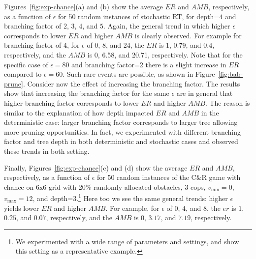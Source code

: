 \documentclass[runningheads]{llncs}
\newcounter{bab}
\newcommand{\vmax}{v_{\text{max}}}
\newcommand{\vmin}{v_{\text{min}}}
\newcommand{\amb}{\mathit{AMB}}
\newcommand{\er}{\mathit{ER}}
\begin{document}
Figures~\ref{fig:exp-chance}(a) and (b) show the average $\er$ and $\amb$, respectively, as a function of $\epsilon$ for 50 random instances of stochastic RT, for depth=$4$ and branching factor of $2$, $3$, $4$, and $5$. Again, the general trend in which higher $\epsilon$ corresponds to lower $\er$ and higher $\amb$ is clearly observed. For example for branching factor of 4, for $\epsilon$ of 0, 8, and 24, the $\er$ is 1, 0.79, and 0.4, respectively, and the $\amb$ is 0, 6.58, and 20.71, respectively.
Note that for the specific case of $\epsilon=80$ and branching factor=2 there is a slight increase in $\er$ compared to $\epsilon=60$. Such rare events are possible, as shown in Figure~\ref{fig:bab-prune}. 
Consider now the effect of increasing the branching factor. The results show that increasing the branching factor for the same $\epsilon$ are in general that higher branching factor corresponds to lower $\er$ and higher $\amb$. The reason is similar to the explanation of how depth impacted $\er$ and $\amb$ in the deterministic case: larger branching factor corresponds to larger tree allowing more pruning opportunities. 
In fact, we experimented with different branching factor and tree depth in both deterministic and stochastic cases and observed these trends in both setting. 

Finally, Figures~\ref{fig:exp-chance}(c) and (d) show the average $\er$ and $\amb$, respectively, as a function of $\epsilon$ for 50 random instances of the C\&R game with chance on 6x6 grid with 20\% randomly allocated obstacles, 3 cops, $\vmin=0$, $\vmax=12$, and depth=$3$.\footnote{We experimented with a wide range of parameters and settings, and show this setting as a representative example.} Here too we see the same general trends: higher $\epsilon$ yields lower $\er$ and higher $\amb$. For example, for $\epsilon$ of $0$, $4$, and $8$, the $er$ is $1$, $0.25$, and $0.07$, respectively, and the $\amb$ is $0$, $3.17$, and $7.19$, respectively.
\end{document}
